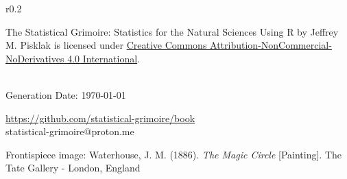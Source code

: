 \vspace*{\fill}

\setlength{\intextsep}{1pt}%
\setlength{\columnsep}{8pt}%
\begin{wrapfigure}{r}{0.2\textwidth}
\href{https://creativecommons.org/licenses/by-nc-nd/4.0/}{}
\end{wrapfigure}

{
\noindent
The Statistical Grimoire: Statistics for the Natural Sciences Using R by \mbox{Jeffrey} M. Pisklak is licensed under \href{https://creativecommons.org/licenses/by-nc-nd/4.0/}{Creative Commons Attribution-NonCommercial-NoDerivatives 4.0 International}.

\noindent
\luatexbanner \\
Generation Date: \today{}



\noindent
{} \url{https://github.com/statistical-grimoire/book} \\
 statistical-grimoire@proton.me


\noindent
Frontispiece image: Waterhouse, J. M. (1886). \textit{The Magic Circle} [Painting]. The Tate Gallery - London, England
}


